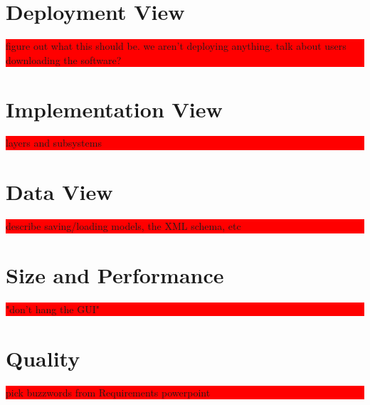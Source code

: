 \documentclass{article}
\newcommand{\todo}[1]{\colorbox{red}{\begin{minipage}{\textwidth}{#1}\end{minipage}}}
\begin{document}
\section{Deployment View}
\todo{figure out what this should be. we aren't deploying anything. talk about users downloading the software?}

\section{Implementation View}
\todo{layers and subsystems}

\section{Data View}
\todo{describe saving/loading models, the XML schema, etc}

\section{Size and Performance}
\todo{"don't hang the GUI"}

\section{Quality}
\todo{pick buzzwords from Requirements powerpoint}
\end{document}
